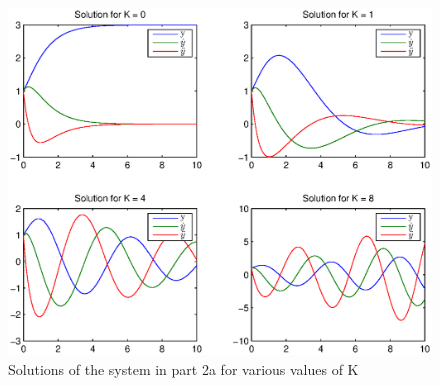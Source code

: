 \begin{figure}
\begin{center}
\includegraphics[scale=0.5]{result21.eps}
\caption{Solutions of the system in part 2a for various values of K}
\label{result21}
\end{center}
\end{figure}


